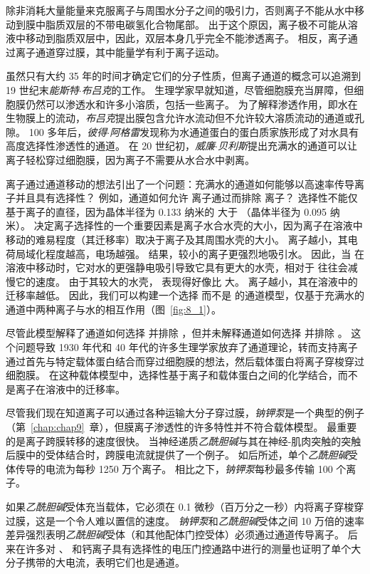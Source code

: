 除非消耗大量能量来克服离子与周围水分子之间的吸引力，否则离子不能从水中移动到膜中脂质双层的不带电碳氢化合物尾部。
出于这个原因，离子极不可能从溶液中移动到脂质双层中，因此，双层本身几乎完全不能渗透离子。
相反，离子通过离子通道穿过膜，其中能量学有利于离子运动。


虽然只有大约 35 年的时间才确定它们的分子性质，但离子通道的概念可以追溯到 19 世纪末\textit{能斯特$\cdot$布吕克}的工作。
生理学家早就知道，尽管细胞膜充当屏障，但细胞膜仍然可以渗透水和许多小溶质，包括一些离子。
为了解释渗透作用，即水在生物膜上的流动，\textit{布吕克}提出膜包含允许水流动但不允许较大溶质流动的通道或孔隙。
100 多年后，\textit{彼得$\cdot$阿格雷}发现称为水通道蛋白的蛋白质家族形成了对水具有高度选择性渗透性的通道。
在 20 世纪初，\textit{威廉$\cdot$贝利斯}提出充满水的通道可以让离子轻松穿过细胞膜，因为离子不需要从水合水中剥离。


离子通过通道移动的想法引出了一个问题：充满水的通道如何能够以高速率传导离子并且具有选择性？
例如，通道如何允许  离子通过而排除  离子？
选择性不能仅基于离子的直径，因为晶体半径为 0.133 纳米的  大于 （晶体半径为 0.095 纳米）。
决定离子选择性的一个重要因素是离子水合水壳的大小，因为离子在溶液中移动的难易程度（其迁移率）取决于离子及其周围水壳的大小。
离子越小，其电荷局域化程度越高，电场越强。
结果，较小的离子更强烈地吸引水。
因此，当  在溶液中移动时，它对水的更强静电吸引导致它具有更大的水壳，相对于  往往会减慢它的速度。
由于其较大的水壳， 表现得好像比  大。
离子越小，其在溶液中的迁移率越低。
因此，我们可以构建一个选择  而不是  的通道模型，仅基于充满水的通道中两种离子与水的相互作用（图~\ref{fig:8_1}）。


尽管此模型解释了通道如何选择  并排除 ，但并未解释通道如何选择  并排除 。
这个问题导致 1930 年代和 40 年代的许多生理学家放弃了通道理论，转而支持离子通过首先与特定载体蛋白结合而穿过细胞膜的想法，然后载体蛋白将离子穿梭穿过细胞膜。
在这种载体模型中，选择性基于离子和载体蛋白之间的化学结合，而不是离子在溶液中的迁移率。


尽管我们现在知道离子可以通过各种运输大分子穿过膜，\textit{钠钾泵}是一个典型的例子（第~\ref{chap:chap9}~章），但膜离子渗透性的许多特性并不符合载体模型。
最重要的是离子跨膜转移的速度很快。 
当神经递质\textit{乙酰胆碱}与其在神经-肌肉突触的突触后膜中的受体结合时，跨膜电流就提供了一个例子。
如后所述，单个\textit{乙酰胆碱}受体传导的电流为每秒 1250 万个离子。
相比之下，\textit{钠钾泵}每秒最多传输 100 个离子。


如果\textit{乙酰胆碱}受体充当载体，它必须在 0.1 微秒（百万分之一秒）内将离子穿梭穿过膜，这是一个令人难以置信的速度。
\textit{钠钾泵}和\textit{乙酰胆碱}受体之间 10 万倍的速率差异强烈表明\textit{乙酰胆碱}受体（和其他配体门控受体）必须通过通道传导离子。
后来在许多对 、 和钙离子具有选择性的电压门控通路中进行的测量也证明了单个大分子携带的大电流，表明它们也是通道。


